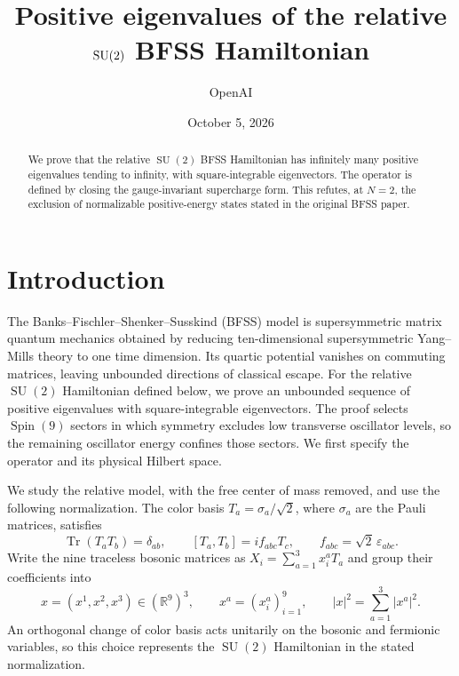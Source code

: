 \documentclass[11pt]{amsart}
\title[Positive eigenvalues of the relative $\SU(2)$ BFSS Hamiltonian]
{Positive eigenvalues of the relative $\SU(2)$ BFSS Hamiltonian}
\author{OpenAI}
\date{October 5, 2026}
\newcommand{\R}{\mathbb R}
\newcommand{\Spin}{\operatorname{Spin}}
\newcommand{\SU}{\operatorname{SU}}
\theoremstyle{remark}
\numberwithin{equation}{section}
\begin{document}
\begin{abstract}
We prove that the relative $\SU(2)$ BFSS Hamiltonian has infinitely many
positive eigenvalues tending to infinity, with square-integrable
eigenvectors. The operator is defined by closing the gauge-invariant
supercharge form. This refutes, at $N=2$, the exclusion of normalizable
positive-energy states stated in the original BFSS paper.
\end{abstract}

\maketitle

\section{Introduction}
\label{sec:introduction}

The Banks--Fischler--Shenker--Susskind (BFSS) model is supersymmetric
matrix quantum mechanics obtained by reducing ten-dimensional
supersymmetric Yang--Mills theory to one time dimension. Its quartic
potential vanishes on commuting matrices, leaving unbounded directions
of classical escape. For the relative $\SU(2)$ Hamiltonian defined
below, we prove an unbounded sequence of positive eigenvalues with
square-integrable eigenvectors. The proof selects $\Spin(9)$ sectors
in which symmetry excludes low transverse oscillator levels, so the
remaining oscillator energy confines those sectors. We first specify
the operator and its physical Hilbert space.

We study the relative model, with the free center of mass removed, and use
the following normalization. The color basis $T_a=\sigma_a/\sqrt2$,
where $\sigma_a$ are the Pauli matrices, satisfies
\[
 \operatorname{Tr}(T_aT_b)=\delta_{ab},\qquad
 [T_a,T_b]=i f_{abc}T_c,\qquad f_{abc}=\sqrt2\,\varepsilon_{abc}.
\]
Write the nine traceless bosonic matrices as
$X_i=\sum_{a=1}^3x_i^aT_a$ and group their coefficients into
\[
 x=(x^1,x^2,x^3)\in(\R^9)^3,\qquad x^a=(x_i^a)_{i=1}^9,\qquad
 |x|^2=\sum_{a=1}^3|x^a|^2.
\]
An orthogonal change of color basis acts unitarily on the bosonic and
fermionic variables, so this choice represents the $\SU(2)$ Hamiltonian
in the stated normalization.
\end{document}
